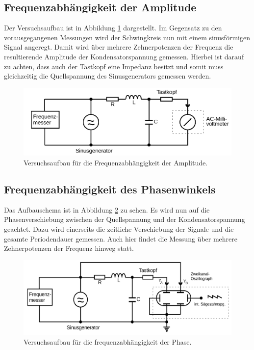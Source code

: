 \subsection{Frequenzabhängigkeit der Amplitude}
Der Versuchsaufbau ist in Abbildung \ref{fig:aufbau3} dargestellt.
Im Gegensatz zu den vorausgegangenen Messungen wird der Schwingkreis nun mit einem sinusförmigen Signal angeregt.
Damit wird über mehrere Zehnerpotenzen der Frequenz die resultierende Amplitude der Kondensatorspannung gemessen.
Hierbei ist darauf zu achten, dass auch der Tastkopf eine Impedanz besitzt und somit muss gleichzeitig die Quellspannung des Sinusgenerators gemessen werden.
\begin{figure}[H]
    \centering
    \caption{Versuchsaufbau für die Frequenzabhängigkeit der Amplitude.\cite{v354}}
    \label{fig:aufbau3}
    \includegraphics[width=\textwidth]{content/aufbau3.png}
\end{figure}
\noindent
%
\subsection{Frequenzabhängigkeit des Phasenwinkels}
Das Aufbauschema ist in Abbildung \ref{fig:aufbau4} zu sehen.
Es wird nun auf die Phasenverschiebung zwischen der Quellspannung und der Kondensatorspannung geachtet.
Dazu wird einerseits die zeitliche Verschiebung der Signale und die gesamte Periodendauer gemessen.
Auch hier findet die Messung über mehrere Zehnerpotenzen der Frequenz hinweg statt.
\begin{figure}[H]
    \centering
    \caption{Versuchsaufbau für die frequenzabhängigkeit der Phase.\cite{v354}}
    \label{fig:aufbau4}
    \includegraphics[width=\textwidth]{content/aufbau4.png}
\end{figure}
\noindent
%
